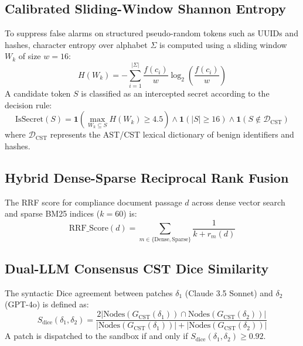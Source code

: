 \documentclass[runningheads]{llncs}
\begin{document}
\subsection{Calibrated Sliding-Window Shannon Entropy}
To suppress false alarms on structured pseudo-random tokens such as UUIDs and hashes, character entropy over alphabet $\Sigma$ is computed using a sliding window $W_k$ of size $w = 16$:
\begin{equation}
H(W_k) = -\sum_{i=1}^{|\Sigma|} \frac{f(c_i)}{w} \log_2 \left(\frac{f(c_i)}{w}\right)
\end{equation}
A candidate token $S$ is classified as an intercepted secret according to the decision rule:
\begin{equation}
\mathrm{IsSecret}(S) = \mathbf{1}\left( \max_{W_k \subseteq S} H(W_k) \ge 4.5 \right) \land \mathbf{1}(|S| \ge 16) \land \mathbf{1}(S \notin \mathcal{D}_{\mathrm{CST}})
\end{equation}
where $\mathcal{D}_{\mathrm{CST}}$ represents the AST/CST lexical dictionary of benign identifiers and hashes.

\subsection{Hybrid Dense-Sparse Reciprocal Rank Fusion}
The RRF score for compliance document passage $d$ across dense vector search and sparse BM25 indices ($k = 60$) is:
\begin{equation}
\mathrm{RRF\_Score}(d) = \sum_{m \in \{\mathrm{Dense}, \mathrm{Sparse}\}} \frac{1}{k + r_m(d)}
\end{equation}

\subsection{Dual-LLM Consensus CST Dice Similarity}
The syntactic Dice agreement between patches $\delta_1$ (Claude 3.5 Sonnet) and $\delta_2$ (GPT-4o) is defined as:
\begin{equation}
S_{\mathrm{dice}}(\delta_1, \delta_2) = \frac{2 \left| \mathrm{Nodes}(G_{\mathrm{CST}}(\delta_1)) \cap \mathrm{Nodes}(G_{\mathrm{CST}}(\delta_2)) \right|}{\left| \mathrm{Nodes}(G_{\mathrm{CST}}(\delta_1)) \right| + \left| \mathrm{Nodes}(G_{\mathrm{CST}}(\delta_2)) \right|}
\end{equation}
A patch is dispatched to the sandbox if and only if $S_{\mathrm{dice}}(\delta_1, \delta_2) \ge 0.92$.
\end{document}
